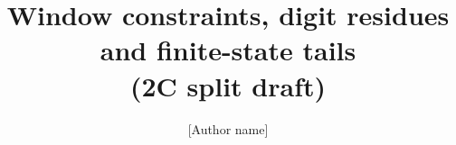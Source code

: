 


\title{Window constraints, digit residues and finite-state tails\\(2C split draft)}
\author{[Author name]\\ \relax[Affiliation]}













